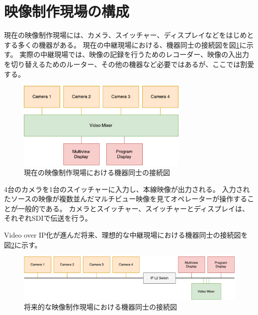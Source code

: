 \section{映像制作現場の構成}

現在の映像制作現場には、カメラ、スイッチャー、ディスプレイなどをはじめとする多くの機器がある。
現在の中継現場における、機器同士の接続図を図\ref{fig:broadcast-diagram-on-sdi}に示す。
実際の中継現場では、映像の記録を行うためのレコーダー、映像の入出力を切り替えるためのルーター、その他の機器など必要ではあるが、ここでは割愛する。

\begin{figure}[htbp]
  \begin{center}
    \includegraphics[bb=0 0 432 222,width=8.233cm]{img/broadcast-diagram-on-sdi.pdf}
  \end{center}
  \caption{現在の映像制作現場における機器同士の接続図}
  \label{fig:broadcast-diagram-on-sdi}
\end{figure}

4台のカメラを1台のスイッチャーに入力し、本線映像が出力される。
入力されたソースの映像が複数並んだマルチビュー映像を見てオペレーターが操作することが一般的である。
カメラとスイッチャー、スイッチャーとディスプレイは、それぞれSDIで伝送を行う。

Video over IP化が進んだ将来、理想的な中継現場における機器同士の接続図を図\ref{fig:broadcast-diagram-on-ip}に示す。

\begin{figure}[htbp]
  \begin{center}
    \includegraphics[bb=0 0 787 161,width=15cm]{img/broadcast-diagram-on-ip.pdf}
  \end{center}
  \caption{将来的な映像制作現場における機器同士の接続図}
  \label{fig:broadcast-diagram-on-ip}
\end{figure}

